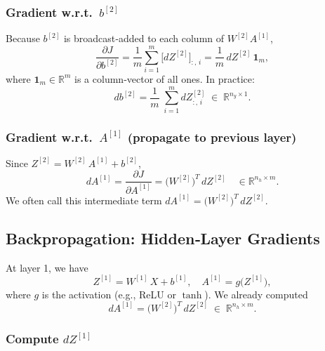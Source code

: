 \documentclass{article}
\begin{document}
\subsubsection{Gradient w.r.t.\ \(b^{[2]}\)}

Because $b^{[2]}$ is broadcast‐added to each column of $W^{[2]}A^{[1]}$,
\[
  \frac{\partial J}{\partial b^{[2]}}
    = \frac{1}{m}\sum_{i=1}^m \bigl[dZ^{[2]}\bigr]_{:,\,i}
    = \frac{1}{m}\, dZ^{[2]}\,\mathbf{1}_m,
\]
where $\mathbf{1}_m \in \mathbb{R}^{m}$ is a column‐vector of all ones.  In practice:
\begin{equation}\label{eq:db2}
  db^{[2]} 
    = \frac{1}{m}\;\sum_{i=1}^m dZ^{[2]}_{:,\,i}
    \;\in\; \mathbb{R}^{n_y \times 1}.
\end{equation}

\subsubsection{Gradient w.r.t.\ \(A^{[1]}\) (propagate to previous layer)}

Since $Z^{[2]} = W^{[2]}\,A^{[1]} + b^{[2]}$,  
\begin{equation}\label{eq:dA1}
  dA^{[1]}
    = \frac{\partial J}{\partial A^{[1]}}
    = \bigl(W^{[2]}\bigr)^{T}\,dZ^{[2]}
    \quad\in \mathbb{R}^{n_h \times m}.
\end{equation}
We often call this intermediate term $dA^{[1]} = \bigl(W^{[2]}\bigr)^{T}\,dZ^{[2]}$.

\bigskip
\subsection{Backpropagation: Hidden‐Layer Gradients}

At layer 1, we have
\[
  Z^{[1]} = W^{[1]}\,X + b^{[1]}, 
  \quad
  A^{[1]} = g\bigl(Z^{[1]}\bigr),
\]
where $g$ is the activation (e.g., ReLU or $\tanh$).  We already computed
\[
  dA^{[1]} = \bigl(W^{[2]}\bigr)^{T}\,dZ^{[2]} 
  \;\in\; \mathbb{R}^{n_h \times m}.
\]

\subsubsection{Compute \(dZ^{[1]}\)}
\end{document}
